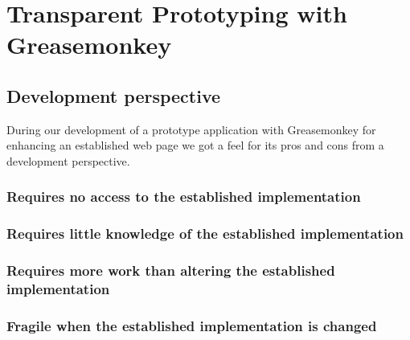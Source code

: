 %


\section{Transparent Prototyping with Greasemonkey}

\subsection{Development perspective}

During our development of a prototype application with Greasemonkey for
enhancing an established web page we got a feel for its pros and cons from a
development perspective.

\subsubsection{Requires no access to the established implementation}

\subsubsection{Requires little knowledge of the established implementation}

\subsubsection{Requires more work than altering the established
  implementation}

\subsubsection{Fragile when the established implementation is changed}

